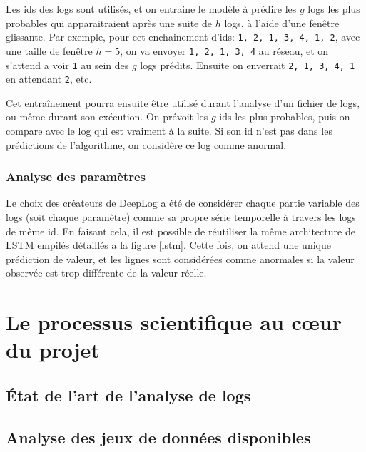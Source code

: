 \documentclass[openany, 12pt]{memoir}
\begin{document}
Les ids des \glspl{log} sont utilisés, et on entraine le modèle à prédire les $g$ \glspl{log} les plus probables qui apparaitraient après une suite de $h$ \glspl{log}, à l'aide d'une fenêtre glissante. Par exemple, pour cet enchainement d'ids: \texttt{1, 2, 1, 3, 4, 1, 2}, avec une taille de fenêtre $h=5$, on va envoyer \texttt{1, 2, 1, 3, 4} au réseau, et on s'attend a voir \texttt{1} au sein des $g$ \glspl{log} prédits. Ensuite on enverrait \texttt{2, 1, 3, 4, 1} en attendant \texttt{2}, etc.

\bigskip
Cet entraînement pourra ensuite être utilisé durant l'analyse d'un fichier de \glspl{log}, ou même durant son exécution. On prévoit les $g$ ids les plus probables, puis on compare avec le \gls{log} qui est vraiment à la suite. Si son id n'est pas dans les prédictions de l'algorithme, on considère ce log comme anormal.

\subsection{Analyse des paramètres}

Le choix des créateurs de DeepLog a été de considérer chaque partie variable des \glspl{log} (soit chaque paramètre) comme sa propre série temporelle à travers les \glspl{log} de même id. En faisant cela, il est possible de réutiliser la même architecture de \gls{LSTM} empilés détaillés a la figure \ref{lstm}. Cette fois, on attend une unique prédiction de valeur, et les lignes sont considérées comme anormales si la valeur observée est trop différente de la valeur réelle.

%

\newpage
\chapter{Le processus scientifique au cœur du projet}

\section{État de l'art de l'analyse de logs}

\section{Analyse des jeux de données disponibles}
\end{document}
